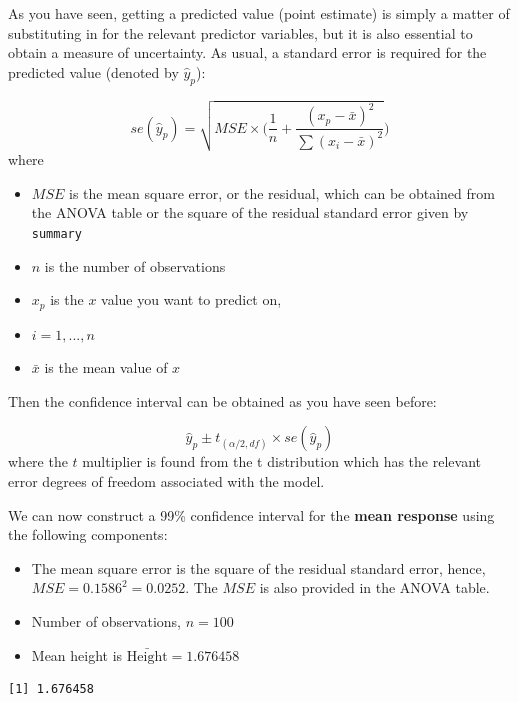 \documentclass[
  oneside]{krantz}
\newenvironment{Shaded}{\begin{snugshade}}{\end{snugshade}}
\newcommand{\FunctionTok}[1]{\textcolor[rgb]{0.00,0.00,0.00}{#1}}
\newcommand{\NormalTok}[1]{#1}
\newcommand{\SpecialCharTok}[1]{\textcolor[rgb]{0.00,0.00,0.00}{#1}}
\providecommand{\tightlist}{%
  \setlength{\itemsep}{0pt}\setlength{\parskip}{0pt}}
\begin{document}
As you have seen, getting a predicted value (point estimate) is simply a matter of substituting in for the relevant predictor variables, but it is also essential to obtain a measure of uncertainty. As usual, a standard error is required for the predicted value (denoted by \(\hat y_p\)):

\[se(\hat{y}_p)=\sqrt{MSE\times (\frac{1}{n}+\frac{(x_p-\bar{x})^2}{\sum{(x_i-\bar{x})^2}}})\]
where

\begin{itemize}
\tightlist
\item
  \(MSE\) is the mean square error, or the residual, which can be obtained from the ANOVA table or the square of the residual standard error given by \texttt{summary}
\item
  \(n\) is the number of observations
\item
  \(x_p\) is the \(x\) value you want to predict on,
\item
  \(i = 1, ..., n\)
\item
  \(\bar x\) is the mean value of \(x\)
\end{itemize}

Then the confidence interval can be obtained as you have seen before:

\[\hat y_p \pm t_{(\alpha/2, df)}\times se(\hat{y}_p)\]
where the \(t\) multiplier is found from the t distribution which has the relevant error degrees of freedom associated with the model.

We can now construct a 99\% confidence interval for the \textbf{mean response} using the following components:

\begin{itemize}
\item
  The mean square error is the square of the residual standard error, hence, \(MSE = 0.1586^2 = 0.0252\). The \(MSE\) is also provided in the ANOVA table.
\item
  Number of observations, \(n=100\)
\item
  Mean height is \(\bar{\mathrm{Height}}=1.676458\)
\end{itemize}

\begin{Shaded}
\end{Shaded}

\begin{verbatim}
[1] 1.676458
\end{verbatim}
\end{document}
